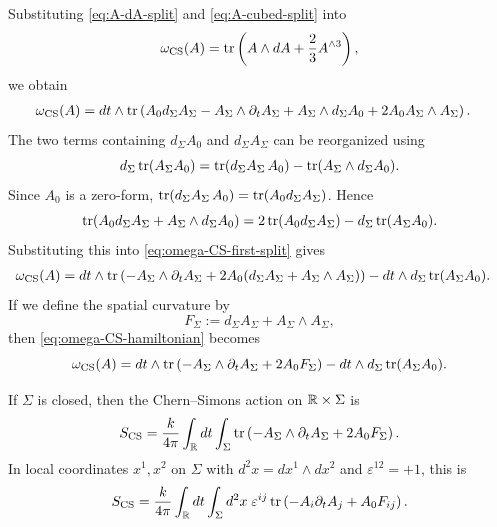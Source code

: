 \noindent Substituting \eqref{eq:A-dA-split} and \eqref{eq:A-cubed-split} into
\begin{equation*}
\omega_{\operatorname{CS}}(A) = \operatorname{tr}\left(A\wedge dA + \frac{2}{3}A^{\wedge 3}\right),
\end{equation*}
we obtain
\begin{align}
\omega_{\operatorname{CS}}(A)
&=
dt\wedge \operatorname{tr}\left(
A_0 d_\Sigma A_\Sigma
- A_\Sigma\wedge \partial_t A_\Sigma
+ A_\Sigma\wedge d_\Sigma A_0
+ 2A_0A_\Sigma\wedge A_\Sigma\right).
\label{eq:omega-CS-first-split}
\end{align}
The two terms containing $d_\Sigma A_0$ and $d_\Sigma A_\Sigma$ can be reorganized using
\begin{equation*}
d_\Sigma\operatorname{tr}(A_\Sigma A_0)
=
\operatorname{tr}(d_\Sigma A_\Sigma\,A_0) - \operatorname{tr}(A_\Sigma\wedge d_\Sigma A_0).
\end{equation*}
Since $A_0$ is a zero-form, $\operatorname{tr}(d_\Sigma A_\Sigma\,A_0)=\operatorname{tr}(A_0 d_\Sigma A_\Sigma)$. Hence
\begin{equation*}
\operatorname{tr}(A_0 d_\Sigma A_\Sigma + A_\Sigma\wedge d_\Sigma A_0)
=
2\operatorname{tr}(A_0 d_\Sigma A_\Sigma) - d_\Sigma\operatorname{tr}(A_\Sigma A_0).
\end{equation*}
Substituting this into \eqref{eq:omega-CS-first-split} gives
\begin{align}
\omega_{\operatorname{CS}}(A)
&=
dt\wedge \operatorname{tr}\left(
-A_\Sigma\wedge \partial_t A_\Sigma
+ 2A_0(d_\Sigma A_\Sigma + A_\Sigma\wedge A_\Sigma)\right)
- dt\wedge d_\Sigma\operatorname{tr}(A_\Sigma A_0).
\label{eq:omega-CS-hamiltonian}
\end{align}
If we define the spatial curvature by
\begin{equation*}
F_\Sigma := d_\Sigma A_\Sigma + A_\Sigma\wedge A_\Sigma,
\end{equation*}
then \eqref{eq:omega-CS-hamiltonian} becomes
\begin{equation}\label{eq:omega-CS-final-split}
\omega_{\operatorname{CS}}(A)
=
dt\wedge \operatorname{tr}\left(-A_\Sigma\wedge \partial_t A_\Sigma + 2A_0F_\Sigma\right)
- dt\wedge d_\Sigma\operatorname{tr}(A_\Sigma A_0).
\end{equation}

\begin{proposition}\label{prop:CS-hamiltonian}
If $\Sigma$ is closed, then the Chern--Simons action on $\mathbb{R}\times \Sigma$ is
\begin{equation}\label{eq:CS-ham}
S_{\operatorname{CS}}
=
\frac{k}{4\pi}\int_{\mathbb{R}} dt\int_\Sigma \operatorname{tr}\left(-A_\Sigma\wedge \partial_t A_\Sigma + 2A_0F_\Sigma\right).
\end{equation}
In local coordinates $x^1,x^2$ on $\Sigma$ with $d^2x = dx^1\wedge dx^2$ and $\varepsilon^{12}=+1$, this is
\begin{equation}\label{eq:CS-ham-components}
S_{\operatorname{CS}}
=
\frac{k}{4\pi}\int_{\mathbb{R}} dt\int_\Sigma d^2x\;
\varepsilon^{ij}\operatorname{tr}\left(-A_i\partial_t A_j + A_0F_{ij}\right).
\end{equation}
\end{proposition}

